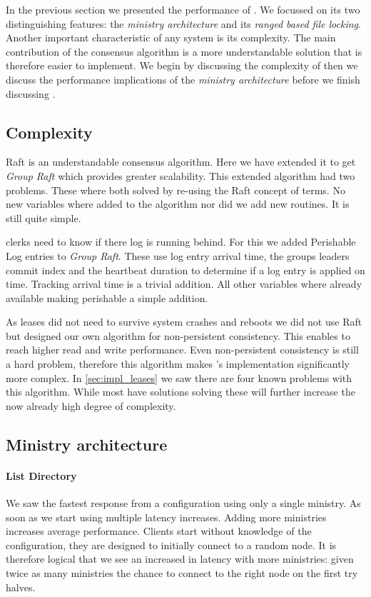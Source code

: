 In the previous section we presented the performance of \name{}. We focussed on its two distinguishing features: the \textit{ministry architecture} and its \textit{ranged based file locking}. Another important characteristic of any system is its complexity. The main contribution of the \raft{} consensus algorithm is a more understandable solution that is therefore easier to implement. We begin by discussing the complexity of \name{} then we discuss the performance implications of the \textit{ministry architecture} before we finish discussing .
%
\subsection{Complexity}
Raft is an understandable consensus algorithm. Here we have extended it to get \textit{Group Raft} which provides greater scalability. This extended algorithm had two problems. These where both solved by re-using the Raft concept of terms. No new variables where added to the algorithm nor did we add new routines. It is still quite simple. 

\Name{} clerks need to know if there log is running behind. For this we added Perishable Log entries to \textit{Group Raft}. These use log entry arrival time, the groups leaders commit index and the heartbeat duration to determine if a log entry is applied on time. Tracking arrival time is a trivial addition. All other variables where already available making perishable a simple addition.

As leases did not need to survive system crashes and reboots we did not use Raft but designed our own algorithm for non-persistent consistency. This enables \name{} to reach higher read and write performance. Even non-persistent consistency is still a hard problem, therefore this algorithm makes \name{}'s implementation significantly more complex. In \cref{sec:impl_leases} we saw there are four known problems with this algorithm. While most have solutions solving these will further increase the now already high degree of complexity.
%
\subsection{Ministry architecture}
\paragraph{List Directory}
We saw the fastest response from a \name{} configuration using only a single ministry. As soon as we start using multiple latency increases. Adding more ministries increases average performance. Clients start without knowledge of the configuration, they are designed to initially connect to a random node. It is therefore logical that we see an increased in latency with more ministries: given twice as many ministries the chance to connect to the right node on the first try halves. 


